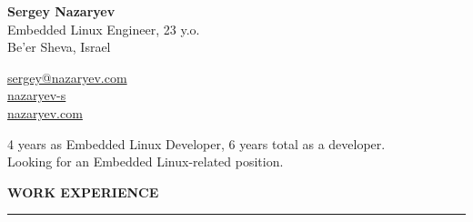 \documentclass[hidelinks]{resume} %
\begin{document}
\begin{minipage}[t]{0.80\textwidth}
{\Huge \textbf{Sergey Nazaryev}}\vspace{2mm}\\
{Embedded Linux Engineer, 23 y.o.}\\
{Be'er Sheva, Israel \vspace{2mm}}\\

\end{minipage}
\begin{minipage}[t]{0.20\textwidth}
\vspace{-5mm}
{\small \faEnvelopeO} {\small \href{mailto:sergey@nazaryev.com}{sergey@nazaryev.com}}\\
{\small \faLinkedin} {\small \href{https://www.linkedin.com/in/nazaryev-s/}{nazaryev-s}}\\
{\small \faLink} {\small \href{https://nazaryev.com}{nazaryev.com}}
\end{minipage} \vspace{-7mm}

{\small
4 years as Embedded Linux Developer, 6 years total as a developer.\\
Looking for an Embedded Linux-related position.
}


\sectionskip
\MakeUppercase{\bf Work experience}
\sectionlineskip
\hrule
\end{document}
